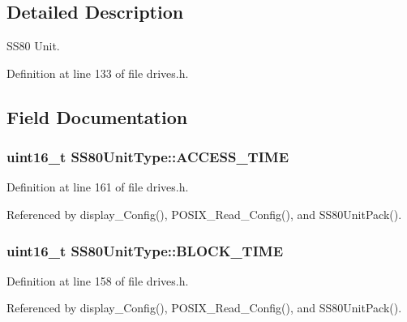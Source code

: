 \subsection{Detailed Description}
S\+S80 Unit. 

Definition at line 133 of file drives.\+h.



\subsection{Field Documentation}
\subsubsection[{\texorpdfstring{A\+C\+C\+E\+S\+S\+\_\+\+T\+I\+ME}{ACCESS_TIME}}]{\setlength{\rightskip}{0pt plus 5cm}uint16\+\_\+t S\+S80\+Unit\+Type\+::\+A\+C\+C\+E\+S\+S\+\_\+\+T\+I\+ME}\hypertarget{structSS80UnitType_ab43ef110f145d428fff831afc18f5e24}{}\label{structSS80UnitType_ab43ef110f145d428fff831afc18f5e24}


Definition at line 161 of file drives.\+h.



Referenced by display\+\_\+\+Config(), P\+O\+S\+I\+X\+\_\+\+Read\+\_\+\+Config(), and S\+S80\+Unit\+Pack().

\subsubsection[{\texorpdfstring{B\+L\+O\+C\+K\+\_\+\+T\+I\+ME}{BLOCK_TIME}}]{\setlength{\rightskip}{0pt plus 5cm}uint16\+\_\+t S\+S80\+Unit\+Type\+::\+B\+L\+O\+C\+K\+\_\+\+T\+I\+ME}\hypertarget{structSS80UnitType_ab94c4b75c74e08e128d4802f5dec0dd5}{}\label{structSS80UnitType_ab94c4b75c74e08e128d4802f5dec0dd5}


Definition at line 158 of file drives.\+h.



Referenced by display\+\_\+\+Config(), P\+O\+S\+I\+X\+\_\+\+Read\+\_\+\+Config(), and S\+S80\+Unit\+Pack().

